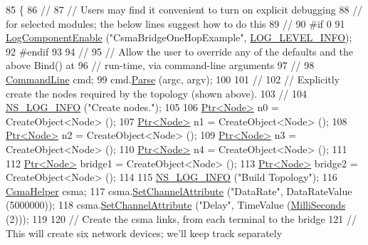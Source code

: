 \begin{DoxyCode}
85 \{
86   \textcolor{comment}{//}
87   \textcolor{comment}{// Users may find it convenient to turn on explicit debugging}
88   \textcolor{comment}{// for selected modules; the below lines suggest how to do this}
89   \textcolor{comment}{//}
90 \textcolor{preprocessor}{#if 0 }
91   \hyperlink{namespacens3_adc4ef4f00bb2f5f4edae67fc3bc27f20}{LogComponentEnable} (\textcolor{stringliteral}{"CsmaBridgeOneHopExample"}, 
      \hyperlink{namespacens3_aa6464a4d69551a9cc968e17a65f39bdbae36aedc880de94fd5a5b53bb9fe65628}{LOG\_LEVEL\_INFO});
92 \textcolor{preprocessor}{#endif}
93 
94   \textcolor{comment}{//}
95   \textcolor{comment}{// Allow the user to override any of the defaults and the above Bind() at}
96   \textcolor{comment}{// run-time, via command-line arguments}
97   \textcolor{comment}{//}
98   \hyperlink{classns3_1_1CommandLine}{CommandLine} cmd;
99   cmd.\hyperlink{classns3_1_1CommandLine_a5c10b85b3207e5ecb48d907966923156}{Parse} (argc, argv);
100 
101   \textcolor{comment}{//}
102   \textcolor{comment}{// Explicitly create the nodes required by the topology (shown above).}
103   \textcolor{comment}{//}
104   \hyperlink{group__logging_gafbd73ee2cf9f26b319f49086d8e860fb}{NS\_LOG\_INFO} (\textcolor{stringliteral}{"Create nodes."});
105 
106   \hyperlink{classns3_1_1Ptr}{Ptr<Node>} n0 = CreateObject<Node> ();
107   \hyperlink{classns3_1_1Ptr}{Ptr<Node>} n1 = CreateObject<Node> ();
108   \hyperlink{classns3_1_1Ptr}{Ptr<Node>} n2 = CreateObject<Node> ();
109   \hyperlink{classns3_1_1Ptr}{Ptr<Node>} n3 = CreateObject<Node> ();
110   \hyperlink{classns3_1_1Ptr}{Ptr<Node>} n4 = CreateObject<Node> ();
111 
112   \hyperlink{classns3_1_1Ptr}{Ptr<Node>} bridge1 = CreateObject<Node> ();
113   \hyperlink{classns3_1_1Ptr}{Ptr<Node>} bridge2 = CreateObject<Node> ();
114 
115   \hyperlink{group__logging_gafbd73ee2cf9f26b319f49086d8e860fb}{NS\_LOG\_INFO} (\textcolor{stringliteral}{"Build Topology"});
116   \hyperlink{classns3_1_1CsmaHelper}{CsmaHelper} csma;
117   csma.\hyperlink{classns3_1_1CsmaHelper_a886d900b2fe44433e0b81752dea7e7f1}{SetChannelAttribute} (\textcolor{stringliteral}{"DataRate"}, DataRateValue (5000000));
118   csma.\hyperlink{classns3_1_1CsmaHelper_a886d900b2fe44433e0b81752dea7e7f1}{SetChannelAttribute} (\textcolor{stringliteral}{"Delay"}, TimeValue (\hyperlink{group__timecivil_gaf26127cf4571146b83a92ee18679c7a9}{MilliSeconds} (2)));
119 
120   \textcolor{comment}{// Create the csma links, from each terminal to the bridge}
121   \textcolor{comment}{// This will create six network devices; we'll keep track separately}

\end{DoxyCode}
